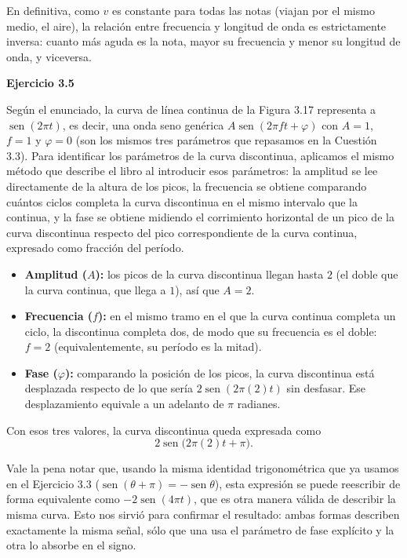 \documentclass[11pt,a4paper]{article}
\newcommand{\sen}{\operatorname{sen}}
\begin{document}
En definitiva, como $v$ es constante para todas las notas (viajan por el mismo medio, el aire), la relación entre frecuencia y longitud de onda es estrictamente inversa: cuanto más aguda es la nota, mayor su frecuencia y menor su longitud de onda, y viceversa.

\vspace{0.3cm}
\noindent\textbf{Ejercicio 3.5}\par

Según el enunciado, la curva de línea continua de la Figura 3.17 representa a $\sen(2\pi t)$, es decir, una onda seno genérica $A\sen(2\pi ft+\varphi)$ con $A=1$, $f=1$ y $\varphi=0$ (son los mismos tres parámetros que repasamos en la Cuestión 3.3). Para identificar los parámetros de la curva discontinua, aplicamos el mismo método que describe el libro al introducir esos parámetros: la amplitud se lee directamente de la altura de los picos, la frecuencia se obtiene comparando cuántos ciclos completa la curva discontinua en el mismo intervalo que la continua, y la fase se obtiene midiendo el corrimiento horizontal de un pico de la curva discontinua respecto del pico correspondiente de la curva continua, expresado como fracción del período.

\begin{itemize}
  \item \textbf{Amplitud ($A$):} los picos de la curva discontinua llegan hasta $2$ (el doble que la curva continua, que llega a $1$), así que $A=2$.
  \item \textbf{Frecuencia ($f$):} en el mismo tramo en el que la curva continua completa un ciclo, la discontinua completa dos, de modo que su frecuencia es el doble: $f=2$ (equivalentemente, su período es la mitad).
  \item \textbf{Fase ($\varphi$):} comparando la posición de los picos, la curva discontinua está desplazada respecto de lo que sería $2\sen(2\pi(2)t)$ sin desfasar. Ese desplazamiento equivale a un adelanto de $\pi$ radianes.
\end{itemize}

Con esos tres valores, la curva discontinua queda expresada como
\[
  2\sen\!\big(2\pi(2)t+\pi\big).
\]

Vale la pena notar que, usando la misma identidad trigonométrica que ya usamos en el Ejercicio 3.3 ($\sen(\theta+\pi)=-\sen\theta$), esta expresión se puede reescribir de forma equivalente como $-2\sen(4\pi t)$, que es otra manera válida de describir la misma curva. Esto nos sirvió para confirmar el resultado: ambas formas describen exactamente la misma señal, sólo que una usa el parámetro de fase explícito y la otra lo absorbe en el signo.
\end{document}
